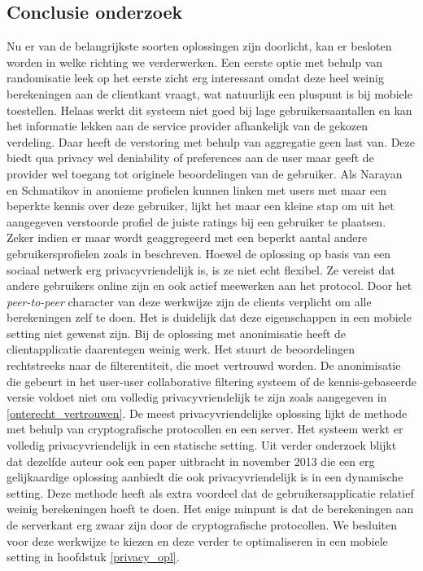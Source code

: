 
\subsection{Conclusie onderzoek}

Nu er van de belangrijkste soorten oplossingen zijn doorlicht, kan er besloten worden in welke richting we verderwerken. Een eerste optie met behulp van randomisatie leek op het eerste zicht erg interessant omdat deze heel weinig berekeningen aan de clientkant vraagt, wat natuurlijk een pluspunt is bij mobiele toestellen. Helaas werkt dit systeem niet goed bij lage gebruikersaantallen en kan het informatie lekken aan de service provider afhankelijk van de gekozen verdeling. Daar heeft de verstoring met behulp van aggregatie geen last van. Deze biedt qua privacy wel deniability of preferences aan de user maar geeft de provider wel toegang tot originele beoordelingen van de gebruiker. Als Narayan en Schmatikov in \cite{Narayanan2008} anonieme profielen kunnen linken met users met maar een beperkte kennis over deze gebruiker, lijkt het maar een kleine stap om uit het aangegeven verstoorde profiel de juiste ratings bij een gebruiker te plaatsen. Zeker indien er maar wordt geaggregeerd met een beperkt aantal andere gebruikersprofielen zoals in \cite{LCA-CONF-2009-014} beschreven. Hoewel de oplossing op basis van een sociaal netwerk erg privacyvriendelijk is, is ze niet echt flexibel. Ze vereist dat andere gebruikers online zijn en ook actief meewerken aan het protocol. Door het \emph{peer-to-peer} character van deze werkwijze zijn de clients verplicht om alle berekeningen zelf te doen. Het is duidelijk dat deze eigenschappen in een mobiele setting niet gewenst zijn.
Bij de oplossing met anonimisatie heeft de clientapplicatie daarentegen weinig werk. Het stuurt de beoordelingen rechtstreeks naar de filterentiteit, die moet vertrouwd worden. De anonimisatie die gebeurt in het user-user collaborative filtering systeem of de kennis-gebaseerde versie voldoet niet om volledig privacyvriendelijk te zijn zoals aangegeven in \ref{onterecht_vertrouwen}. De meest privacyvriendelijke oplossing lijkt de methode met behulp van cryptografische protocollen en een server. Het systeem werkt er volledig privacyvriendelijk in een statische setting. Uit verder onderzoek blijkt dat dezelfde auteur ook een paper uitbracht in november 2013 \cite{ZErkinDyn} die een erg gelijkaardige oplossing aanbiedt die ook privacyvriendelijk is in een dynamische setting. Deze methode heeft als extra voordeel dat de gebruikersapplicatie relatief weinig berekeningen hoeft te doen. Het enige minpunt is dat de berekeningen aan de serverkant erg zwaar zijn door de cryptografische protocollen. We besluiten voor deze werkwijze te kiezen en deze verder te optimaliseren in een mobiele setting in hoofdstuk \ref{privacy_opl}.